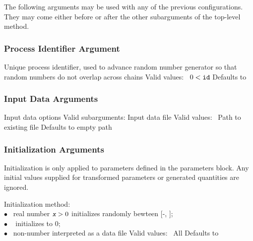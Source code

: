 The following arguments may be used with any of the previous
configurations.   They may come either before or after the other
subarguments of the top-level method.

\subsubsection{Process Identifier Argument}

\begin{description}
  {Unique process identifier, used to advance random number generator so that random numbers do not overlap across chains}
  {Valid values: \  $0 < \mbox{{\tt id}}$}
  {Defaults to }
%
\end{description}

\subsubsection{Input Data Arguments}

\begin{description}

  {Input data options}
  {Valid subarguments: }
%
    {Input data file}
    {Valid values: \  Path to existing file}
    {Defaults to empty path}
%
\end{description}

\subsubsection{Initialization Arguments}

Initialization is only applied to parameters defined in the parameters
block.  Any initial values supplied for transformed parameters or
generated quantities are ignored. 

\begin{description}
  {Initialization method: \\
        \hspace*{8pt} $\bullet$ \ real number $\mbox{\farg{x}} > 0$ initializes randomly bewteen [-,
        ]; 
        \\
        \hspace*{8pt} $\bullet$ \   initializes to 0; 
        \\
        \hspace*{8pt} $\bullet$ \  non-number interpreted as a data file}
  {Valid values: \  All}
  {Defaults to }
%
\end{description}


